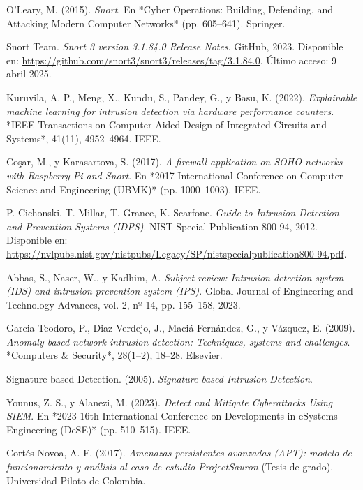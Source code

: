 \documentclass[12pt,a4paper]{report}
\begin{document}
\begin{thebibliography}{29}
	O'Leary, M. (2015). \textit{Snort}. En *Cyber Operations: Building, Defending, and Attacking Modern Computer Networks* (pp. 605--641). Springer.
	
	Snort Team. \textit{Snort 3 version 3.1.84.0 Release Notes}. GitHub, 2023. Disponible en: \url{https://github.com/snort3/snort3/releases/tag/3.1.84.0}. Último acceso: 9 abril 2025.
	
	Kuruvila, A. P., Meng, X., Kundu, S., Pandey, G., y Basu, K. (2022). \textit{Explainable machine learning for intrusion detection via hardware performance counters}. *IEEE Transactions on Computer-Aided Design of Integrated Circuits and Systems*, 41(11), 4952--4964. IEEE.
	
	Coşar, M., y Karasartova, S. (2017). \textit{A firewall application on SOHO networks with Raspberry Pi and Snort}. En *2017 International Conference on Computer Science and Engineering (UBMK)* (pp. 1000--1003). IEEE.
	
	P. Cichonski, T. Millar, T. Grance, K. Scarfone. \textit{Guide to Intrusion Detection and Prevention Systems (IDPS)}. NIST Special Publication 800-94, 2012. Disponible en: \url{https://nvlpubs.nist.gov/nistpubs/Legacy/SP/nistspecialpublication800-94.pdf}.
	
	Abbas, S., Naser, W., y Kadhim, A. \textit{Subject review: Intrusion detection system (IDS) and intrusion prevention system (IPS)}. Global Journal of Engineering and Technology Advances, vol. 2, nº 14, pp. 155–158, 2023.
	
	Garcia-Teodoro, P., Diaz-Verdejo, J., Maciá-Fernández, G., y Vázquez, E. (2009). \textit{Anomaly-based network intrusion detection: Techniques, systems and challenges}. *Computers \& Security*, 28(1–2), 18--28. Elsevier.
	
	
	Signature-based Detection. (2005). \textit{Signature-based Intrusion Detection}.
	
	Younus, Z. S., y Alanezi, M. (2023). \textit{Detect and Mitigate Cyberattacks Using SIEM}. En *2023 16th International Conference on Developments in eSystems Engineering (DeSE)* (pp. 510--515). IEEE.
	
	Cortés Novoa, A. F. (2017). \textit{Amenazas persistentes avanzadas (APT): modelo de funcionamiento y análisis al caso de estudio ProjectSauron} (Tesis de grado). Universidad Piloto de Colombia.
	

\end{thebibliography}
\end{document}
